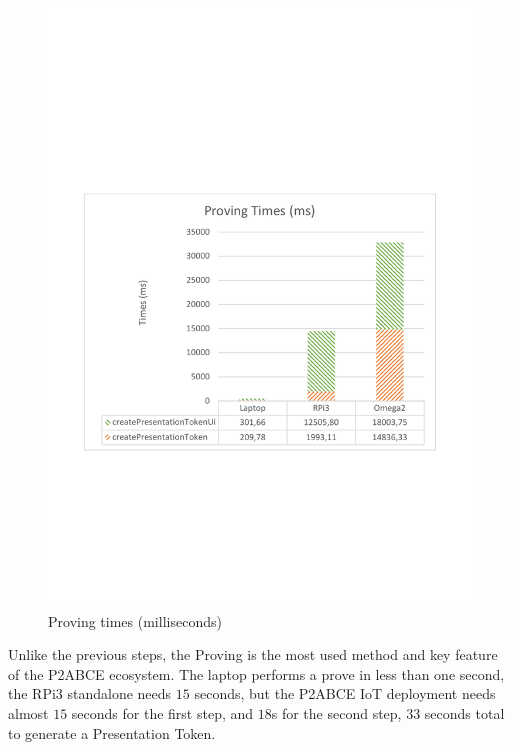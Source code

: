 \begin{figure}[bth]
	\centering
	\includegraphics[width=0.8\linewidth]{gfx/graphics/ProvingGraphTable}
	\caption{Proving times (milliseconds)}%
	\label{fig:proving:graph}
\end{figure}


Unlike the previous steps, the Proving is the most used method and key feature of the P2ABCE ecosystem. The laptop performs a prove in less than one second, the RPi3 standalone needs $15$ seconds, but the P2ABCE IoT deployment needs almost $15$ seconds for the first step, and $18$s for the second step, $33$ seconds total to generate a Presentation Token.

\hfil


